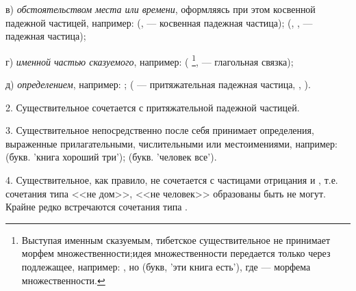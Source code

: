 в) \emph{обстоятельством места или времени}, оформляясь при этом косвенной падежной частицей, например:
 (, 
 --- косвенная падежная частица);
(, ,  --- падежная частица);

г) \emph{именной частью сказуемого}, например:
(
\footnote[26]{
Выступая именным сказуемым, тибетское существительное не принимает морфем множественности;идея множественности передается только через подлежащее, например: , но
(букв, 'эти книга есть'), где  --- морфема множественности.
},
 --- глагольная связка);

д) \emph{определением}, например:
;
( --- притяжательная падежная частица, ,
).

2. Существительное сочетается с притяжательной падежной частицей.

3. Существительное непосредственно после себя принимает определения, выраженные прилагательными, числительными или местоимениями, например:
 (букв. 'книга хороший три');
 (букв. 'человек все').

4. Существительное, как правило, не сочетается с частицами отрицания  и , т.е. сочетания типа <<не дом>>, <<не человек>> образованы быть не могут. Крайне редко встречаются сочетания типа	.